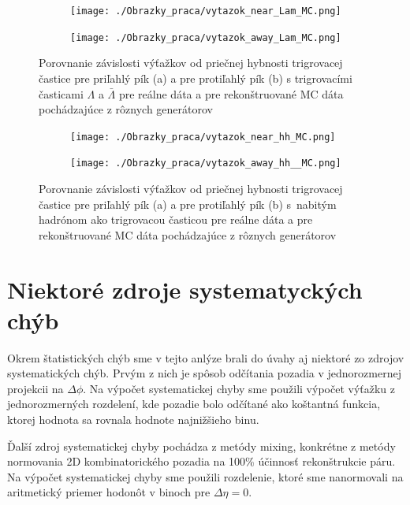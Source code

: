 \documentclass[thesismargins, thesislinespacing]{rnthesis}
\begin{document}
\begin{figure}[hbtp!]
	\centering
\begin{subfigure}{0.5\textwidth}
	\centering
	\texttt{[image: ./Obrazky\_praca/vytazok\_near\_Lam\_MC.png]}
	\caption{}
\end{subfigure}%
\begin{subfigure}{0.5\textwidth}
	\centering
	\texttt{[image: ./Obrazky\_praca/vytazok\_away\_Lam\_MC.png]}
	\caption{}
\end{subfigure}
	\caption{Porovnanie závislosti výťažkov od priečnej hybnosti trigrovacej častice pre priľahlý pík (a) a pre protiľahlý pík (b) s trigrovacími časticami $\Lambda$ a $\bar{\Lambda}$ pre reálne dáta a pre rekonštruované MC dáta pochádzajúce z rôznych generátorov}
	\label{porovnanieL}
\end{figure}

\begin{figure}[hbtp!]
	\centering
	\begin{subfigure}{0.5\textwidth}
		\centering
		\texttt{[image: ./Obrazky\_praca/vytazok\_near\_hh\_MC.png]}
		\caption{}
	\end{subfigure}%
	\begin{subfigure}{0.5\textwidth}
		\centering
		\texttt{[image: ./Obrazky\_praca/vytazok\_away\_hh\_\_MC.png]}
		\caption{}
	\end{subfigure}
	\caption{Porovnanie závislosti výťažkov od priečnej hybnosti trigrovacej častice pre priľahlý pík (a) a pre protiľahlý pík (b) s~nabitým hadrónom ako trigrovacou časticou pre reálne dáta a pre rekonštruované MC dáta pochádzajúce z rôznych generátorov}
	\label{porovnanieh}
\end{figure}

\section{Niektoré zdroje systematyckých chýb}

Okrem štatistických chýb sme v tejto anlýze brali do úvahy aj niektoré zo zdrojov systematických chýb. Prvým z nich je spôsob odčítania pozadia v jednorozmernej projekcii na $\Delta\phi$. Na výpočet systematickej chyby sme použili výpočet výťažku z jednorozmerných rozdelení, kde pozadie bolo odčítané ako koštantná funkcia, ktorej hodnota sa rovnala hodnote najnižšieho binu. 

Ďalší zdroj systematickej chyby pochádza z metódy mixing, konkrétne z metódy normovania 2D kombinatorického pozadia na 100\% účinnosť rekonštrukcie páru. Na výpočet systematickej chyby sme použili rozdelenie, ktoré sme nanormovali na aritmetický priemer hodonôt v binoch pre $\Delta \eta = 0$.  
\end{document}
